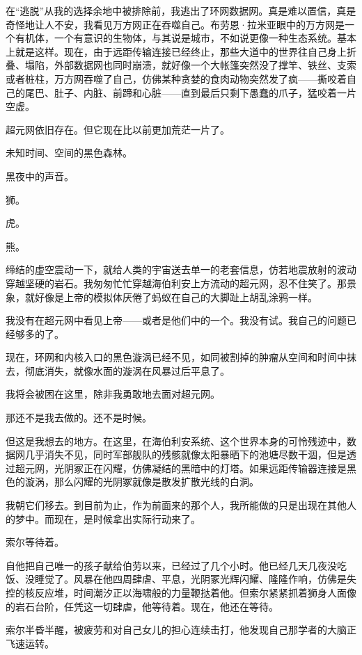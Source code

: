 \documentclass[AutoFakeBold=true]{book}
\begin{document}
{\kaishu 在``逃脱''从我的选择余地中被排除前，我逃出了环网数据网。真是难以置信，真是奇怪地让人不安，我看见万方网正在吞噬自己。布劳恩·拉米亚眼中的万方网是一个有机体，一个有意识的生物体，与其说是城市，不如说更像一种生态系统。基本上就是这样。现在，由于远距传输连接已经终止，那些大道中的世界往自己身上折叠、塌陷，外部数据网也同时崩溃，就好像一个大帐篷突然没了撑竿、铁丝、支索或者桩柱，万方网吞噬了自己，仿佛某种贪婪的食肉动物突然发了疯——撕咬着自己的尾巴、肚子、内脏、前蹄和心脏——直到最后只剩下愚蠢的爪子，猛咬着一片空虚。

超元网依旧存在。但它现在比以前更加荒茫一片了。

未知时间、空间的黑色森林。

黑夜中的声音。

狮。

虎。

熊。

缔结的虚空震动一下，就给人类的宇宙送去单一的老套信息，仿若地震放射的波动穿越坚硬的岩石。我匆匆忙忙穿越海伯利安上方流动的超元网，忍不住笑了。那景象，就好像是上帝的模拟体厌倦了蚂蚁在自己的大脚趾上胡乱涂鸦一样。

我没有在超元网中看见上帝——或者是他们中的一个。我没有试。我自己的问题已经够多的了。

现在，环网和内核入口的黑色漩涡已经不见，如同被割掉的肿瘤从空间和时间中抹去，彻底消失，就像水面的漩涡在风暴过后平息了。

我将会被困在这里，除非我勇敢地去面对超元网。

那还不是我去做的。还不是时候。

但这是我想去的地方。在这里，在海伯利安系统、这个世界本身的可怜残迹中，数据网几乎消失不见，同时军部舰队的残骸就像太阳暴晒下的池塘尽数干涸，但是透过超元网，光阴冢正在闪耀，仿佛凝结的黑暗中的灯塔。如果远距传输器连接是黑色的漩涡，那么闪耀的光阴冢就像是散发扩散光线的白洞。

我朝它们移去。到目前为止，作为前面来的那个人，我所能做的只是出现在其他人的梦中。而现在，是时候拿出实际行动来了。}

\vspace*{1em}

索尔等待着。

自他把自己唯一的孩子献给伯劳以来，已经过了几个小时。他已经几天几夜没吃饭、没睡觉了。风暴在他四周肆虐、平息，光阴冢光辉闪耀、隆隆作响，仿佛是失控的核反应堆，时间潮汐正以海啸般的力量鞭挞着他。但索尔紧紧抓着狮身人面像的岩石台阶，任凭这一切肆虐，他等待着。现在，他还在等待。

索尔半昏半醒，被疲劳和对自己女儿的担心连续击打，他发现自己那学者的大脑正飞速运转。
\end{document}
